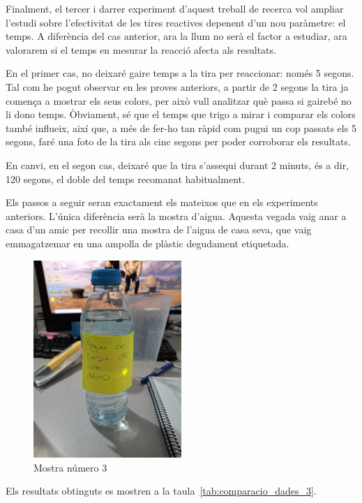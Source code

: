 Finalment, el tercer i darrer experiment d’aquest treball de recerca vol ampliar l'estudi sobre l'efectivitat de les tires reactives depenent d'un nou paràmetre: el temps. A diferència del cas anterior, ara la llum no serà el factor a estudiar, ara valorarem si el temps en mesurar la reacció afecta als resultats.

En el primer cas, no deixaré gaire temps a la tira per reaccionar: només 5 segons. Tal com he pogut observar en les proves anteriors, a partir de 2 segons la tira ja comença a mostrar els seus colors, per això vull analitzar què passa si gairebé no li dono temps. Òbviament, sé que el temps que trigo a mirar i comparar els colors també influeix, així que, a més de fer-ho tan ràpid com pugui un cop passats els 5 segons, faré una foto de la tira als cinc segons per poder corroborar els resultats.

En canvi, en el segon cas, deixaré que la tira s’assequi durant 2 minuts, és a dir, 120 segons, el doble del temps recomanat habitualment.

Els passos a seguir seran exactament els mateixos que en els experiments anteriors. L’única diferència serà la mostra d’aigua. Aquesta vegada vaig anar a casa d’un amic per recollir una mostra de l’aigua de casa seva, que vaig emmagatzemar en una ampolla de plàstic degudament etiquetada.

\begin{figure}[H]
\centering
\includegraphics[width=0.5\textwidth, angle=270]{./Figures/ex3.png}
\caption{Mostra número 3}
\label{fig:Mostra3}
\end{figure}
\clearpage
Els resultats obtinguts es mostren a la taula~\ref{tab:comparacio_dades_3}.
%


